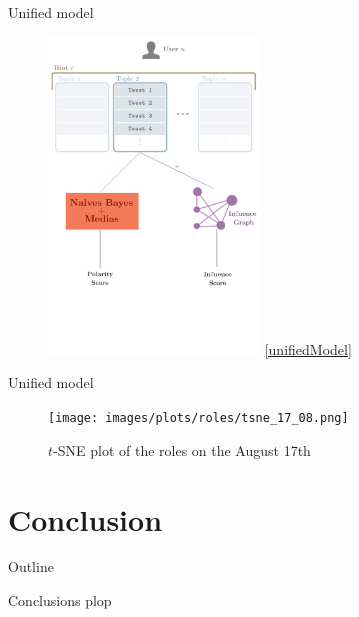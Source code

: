 \documentclass[first=dblue,second=red,logo=blueexc]{aaltoslides}
\begin{document}
\begin{frame}{Unified model}
\begin{figure}[H]
\centering
\includegraphics[width=0.5\textwidth]{images/diags/chain.png}
\ref{unifiedModel}
\end{figure}

\end{frame}


\begin{frame}{Unified model}
\begin{figure}[H]
\centering
\texttt{[image: images/plots/roles/tsne\_17\_08.png]}
\caption{$t$-SNE plot of the roles on the August 17th}
\label{}
\end{figure}
\end{frame}


\section{Conclusion}
\begin{frame}{Outline}
\tableofcontents[sectionstyle=show/shaded]
\end{frame}

\begin{frame}{Conclusions}
plop
\end{frame}
\end{document}
